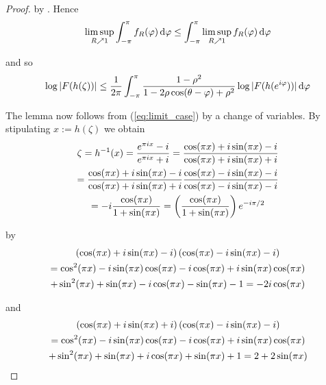 \begin{proof}
\noindent by \cite[358]{bourbaki:general_topology:1995}. Hence
\begin{equation*}
	\limsup_{R \nearrow 1} \int_{-\pi}^\pi f_R(\varphi) \mathop{}\!\mathrm{d}\varphi \leq\int_{-\pi}^\pi \limsup_{R \nearrow 1}f_R(\varphi) \mathop{}\!\mathrm{d}\varphi
\end{equation*}

\noindent and so 
\begin{equation}
	\log\abs[0]{ F( h( \zeta ) )} \leq \frac{1}{2\pi} \int_{-\pi}^\pi \frac{1 - \rho^2}{1 - 2\rho\cos( \theta - \varphi ) + \rho^2}\log\abs[0]{ F( h( e^{i\varphi}))}\d\varphi	
	\label{eq:limit_case}
\end{equation}

The lemma now follows from (\ref{eq:limit_case}) by a change of variables. By stipulating $x := h( \zeta )$ we obtain 
\begin{multline}
	\zeta = h^{-1}(x) = \frac{e^{\pi i x}- i}{e^{\pi i x} + i} = \frac{\cos(\pi x) + i\sin(\pi x) - i}{\cos(\pi x) + i\sin(\pi x) + i}\\
		= \frac{\cos(\pi x) + i\sin(\pi x) - i}{\cos(\pi x) + i\sin(\pi x) + i}\frac{\cos(\pi x) - i\sin(\pi x) - i}{\cos(\pi x) - i\sin(\pi x) - i}\\
		= -i \frac{\cos(\pi x)}{1 + \sin(\pi x)} = \del[3]{ \frac{\cos(\pi x)}{1 + \sin(\pi x)} }e^{-i\pi/2}
	\label{eq:radius_angle}
\end{multline}

\noindent by
\begin{multline*}
	\del[0]{\cos(\pi x) + i\sin(\pi x) - i}\del[0]{\cos(\pi x) - i\sin(\pi x) - i}\\ = \cos^2(\pi x) - i\sin(\pi x)\cos(\pi x)	
		-i\cos(\pi x) + i\sin(\pi x)\cos(\pi x)\\
	 	+ \sin^2(\pi x) + \sin(\pi x) - i \cos(\pi x) - \sin(\pi x) - 1 = -2i \cos(\pi x)  
\end{multline*}

\noindent and
\begin{multline*}
	\del[0]{ \cos(\pi x) + i\sin(\pi x) + i }\del[0]{ \cos(\pi x) - i\sin(\pi x) - i }\\ = \cos^2(\pi x) - i\sin(\pi x)\cos(\pi x) - i\cos(\pi x) + i\sin(\pi x)\cos(\pi x)\\
	+ \sin^2(\pi x) + \sin(\pi x)+ i \cos(\pi x) + \sin(\pi x) + 1 = 2 + 2\sin(\pi x)
\end{multline*}


\end{proof}
